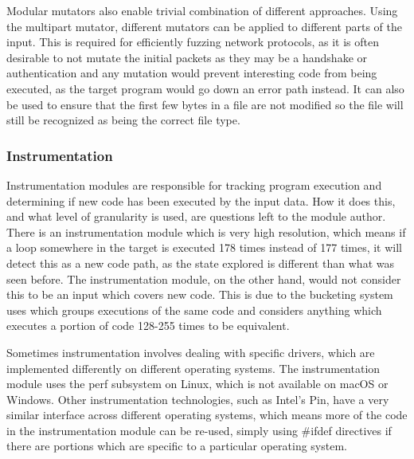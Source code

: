 Modular mutators also enable trivial combination of different approaches. Using
the multipart mutator, different mutators can be applied to different parts of
the input. This is required for efficiently fuzzing network protocols, as it is
often desirable to not mutate the initial packets as they may be a handshake or
authentication and any mutation would prevent interesting code from being
executed, as the target program would go down an error path instead. It can
also be used to ensure that the first few bytes in a file are not modified so
the file will still be recognized as being the correct file type.


\subsubsection{Instrumentation} \label{Instrumentation Overview}
Instrumentation modules are responsible for tracking program execution and
determining if new code has been executed by the input data. How it does this,
and what level of granularity is used, are questions left to the module author.
There is an \IPT{} instrumentation module which is very high resolution, which
means if a loop somewhere in the target is executed 178 times instead of 177
times, it will detect this as a new code path, as the state explored is
different than what was seen before.  The \AFL{} instrumentation module, on the
other hand, would not consider this to be an input which covers new code. This
is due to the bucketing system \AFL{} uses which groups executions of the same
code and considers anything which executes a portion of code 128-255 times to
be equivalent.

Sometimes instrumentation involves dealing with specific drivers, which are
implemented differently on different operating systems. The \IPT{}
instrumentation module uses the perf subsystem on Linux, which is not available
on macOS or Windows. Other instrumentation technologies, such as Intel's
Pin\cite{pin}, have a very similar interface across different operating
systems, which means more of the code in the instrumentation module can be
re-used, simply using \#ifdef directives if there are portions which are
specific to a particular operating system.

